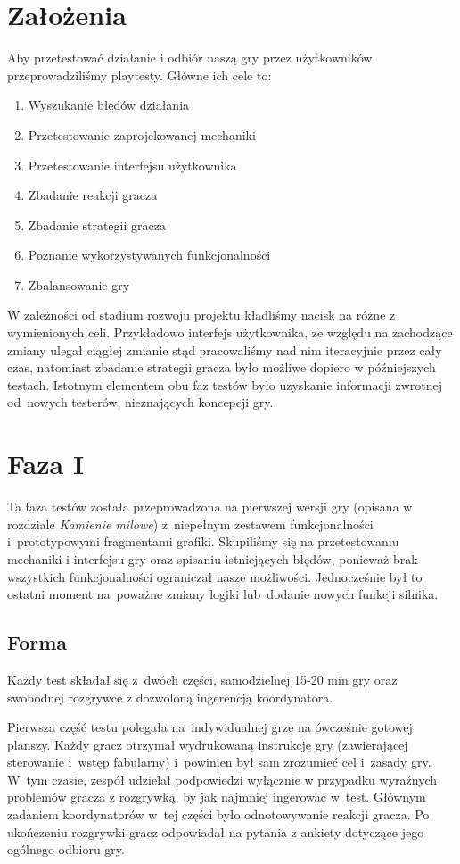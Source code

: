 \documentclass[licencjacka]{pracamgr}
\begin{document}
  \section{Założenia}
    Aby przetestować działanie i odbiór naszą gry przez użytkowników przeprowadziliśmy playtesty. Główne ich cele to:
    \begin{enumerate}
    \item Wyszukanie błędów działania
    \item Przetestowanie zaprojekowanej mechaniki
    \item Przetestowanie interfejsu użytkownika
    \item Zbadanie reakcji gracza
    \item Zbadanie strategii gracza
    \item Poznanie wykorzystywanych funkcjonalności
    \item Zbalansowanie gry
    \end{enumerate}
    W zależności od stadium rozwoju projektu kładliśmy nacisk na różne z wymienionych celi. Przykładowo interfejs użytkownika,
    ze względu na zachodzące zmiany ulegał ciągłej zmianie stąd pracowaliśmy nad nim iteracyjnie przez cały czas, natomiast
    zbadanie strategii gracza było możliwe dopiero w późniejszych testach. Istotnym elementem obu faz testów było uzyskanie
    informacji zwrotnej od~nowych testerów, nieznających koncepcji gry.

  \section{Faza I}
    Ta faza testów została przeprowadzona na pierwszej wersji gry (opisana w rozdziale \emph{Kamienie milowe})
    z~niepełnym zestawem funkcjonalności i~prototypowymi fragmentami grafiki. Skupiliśmy się na przetestowaniu mechaniki
    i interfejsu gry oraz spisaniu istniejących błędów, ponieważ brak wszystkich funkcjonalności ograniczał nasze możliwości.
    Jednocześnie był to ostatni moment na~poważne zmiany logiki lub~dodanie nowych funkcji silnika.

    \subsection{Forma}
      Każdy test składał  się z~dwóch części, samodzielnej 15-20 min gry
      oraz swobodnej rozgrywce z dozwoloną ingerencją koordynatora.

      Pierwsza część testu polegała na~indywidualnej grze na ówcześnie gotowej planszy.
      Każdy gracz otrzymał wydrukowaną instrukcję gry (zawierającej sterowanie i~wstęp fabularny)
      i~powinien był sam zrozumieć cel i~zasady gry. W~tym czasie, zespół udzielał podpowiedzi
      wyłącznie w przypadku wyraźnych problemów gracza z rozgrywką, by jak najmniej ingerować w~test.
      Głównym zadaniem koordynatorów w~tej części było odnotowywanie reakcji gracza.
      Po ukończeniu rozgrywki gracz odpowiadał na pytania z ankiety dotyczące jego ogólnego odbioru gry.
\end{document}
